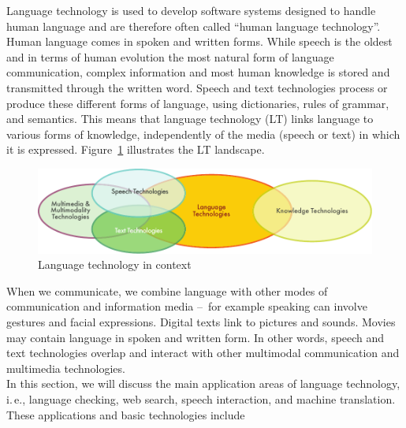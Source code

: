 \clearpage


\begin{multicols}{2}

Language technology is used to develop software systems designed to handle human language and are therefore often called “human language technology”. Human language comes in spoken and written forms. While speech is the oldest and in terms of human evolution the most natural form of language communication, complex information and most human knowledge is stored and transmitted through the written word. Speech and text technologies process or produce these different forms of language, using dictionaries, rules of grammar, and semantics. This means that language technology (LT) links language to various forms of knowledge, independently of the media (speech or text) in which it is expressed. Figure~\ref{fig:ltincontext_en} illustrates the LT landscape.

\begin{figure}[htb]
  \center
  \includegraphics[width=\textwidth]{../_media/english/language_technologies}
  \caption{Language technology in context}
\label{fig:ltincontext_en}
\end{figure}

When we communicate, we combine language with other modes of communication and information media --~for example speaking can involve gestures and facial expressions. Digital texts link to pictures and sounds. Movies may contain language in spoken and written form. In other words, speech and text technologies overlap and interact with other multimodal communication and multimedia technologies.\\ 
In this section, we will discuss the main application areas of language technology, i.\,e., language checking, web search, speech interaction, and machine translation. These applications and basic technologies include 


\end{multicols}
